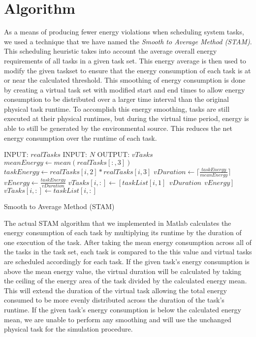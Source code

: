 
\section{Algorithm} \label{sec:algorithm}

As a means of producing fewer energy violations when scheduling system tasks, we used a technique that we have named the \emph{Smooth to Average Method (STAM)}. This scheduling heuristic takes into account the average overall energy requirements of all tasks in a given task set. This energy average is then used to modify the given taskset to ensure that the energy consumption of each task is at or near the calculated threshold. This smoothing of energy consumption is done by creating a virtual task set with modified start and end times to allow energy consumption to be distributed over a larger time interval than the original physical task runtime. To accomplish this energy smoothing, tasks are still executed at their physical runtimes, but during the virtual time period, energy is able to still be generated by the environmental source. This reduces the net energy consumption over the runtime of each task.

\begin{algorithm}[tb]
\label{stamalg}
\begin{algorithmic}
\STATE INPUT: $realTasks$  
\STATE INPUT: $N$ 
\STATE OUTPUT: $vTasks$ 
\STATE $meanEnergy \gets mean(realTasks[:,3])$
\STATE $taskEnergy \gets realTasks[i, 2] * realTasks[i,3]$
\STATE $vDuration \gets \lceil \frac{taskEnergy}{meanEnergy} \rceil$
\STATE $vEnergy \gets \frac{taskEnergy}{vDuration}$
\STATE $vTasks[i,:] \gets [taskList[i,1]~~vDuration~~vEnergy]$
\ELSE
\STATE $vTasks[i,:] \gets taskList[i,:]$
\ENDIF
\ENDFOR
\end{algorithmic}
\caption{Smooth to Average Method (STAM)}
\end{algorithm}

The actual STAM algorithm that we implemented in Matlab calculates the energy consumption of each task by multiplying its runtime by the duration of one execution of the task. After taking the mean energy consumption across all of the tasks in the task set, each task is compared to the this value and virtual tasks are scheduled accordingly for each task. If the given task's energy consumption is above the mean energy value, the virtual duration will be calculated by taking the ceiling of the energy area of the task divided by the calculated energy mean. This will extend the duration of the virtual task allowing the total energy consumed to be more evenly distributed across the duration of the task's runtime. If the given task's energy consumption is below the calculated energy mean, we are unable to perform any smoothing and  will use the unchanged physical task for the simulation procedure.